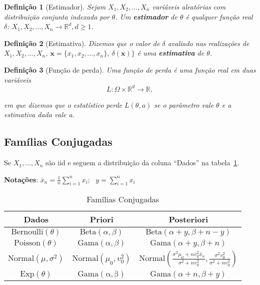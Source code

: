 \documentclass{article}
\newtheorem{definition}{Definição}
\begin{document}
	\begin{definition}[Estimador]
		Sejam $X_1, X_2, \ldots, X_n$ variáveis aleatórias com distribuição conjunta indexada por $\theta$. Um \textbf{estimador} de $\theta$ é qualquer função real $\delta$: $X_1, X_2, \ldots, X_n \rightarrow \mathbb{R}^d, d \geq 1$.
	\end{definition}
	
	\begin{definition}[Estimativa]
		Dizemos que o valor de $\delta$ avaliado nas realizações de $X_1, X_2, \ldots, X_n$, $\textbf{x} = \{x_1, x_2, \ldots, x_n\}, \ \delta(\textbf{x})\}$ é uma \textbf{estimativa} de $\theta$.
	\end{definition}
	
	\begin{definition}[Função de perda]
		Uma função de perda é uma função real em duas variáveis 
		\begin{equation}
			L: \Omega \times \mathbb{R}^d \rightarrow \mathbb{R},
		\end{equation}
		
		em que dizemos que o estatístico \textit{perde} $L(\theta, a)$ se o parâmetro vale $\theta$ e a estimativa dada vale a.
	\end{definition}
	
	\subsection*{Famílias Conjugadas}
	
	Se $X_1,\ldots,X_n$ são iid e seguem a distribuição da coluna ``Dados'' na tabela~\ref{tab:1}.
	
	\textbf{Notações}: $\bar {x}_n= \frac{1}{n}\sum_{i=1}^n x_i;~~~
	y=\sum_{i=1}^nx_i$
	\begin{table}[!htb]
		\centering
		\begin{tabular}{|c|c|c|}
			\hline \textbf{Dados} & \textbf{Priori} & \textbf{Posteriori}\\ \hline
			$\mathrm{Bernoulli}(\theta)$&$\mathrm{Beta}(\alpha,\beta)$ & $\mathrm{Beta}(\alpha+y,\beta+n-y)$ \\ \hline
			$\mathrm{Poisson}(\theta)$&$\mathrm{Gama}(\alpha,\beta)$&$\mathrm{Gama}(\alpha+y,\beta+n)$\\ \hline 
			$\mathrm{Normal}(\mu,\sigma^2)$ & $\mathrm{Normal}(\mu_0,v_0^2)$& $\mathrm{Normal}\left(\frac{\sigma^2\mu_0+nv_0^2\bar{x}_n}{\sigma^2+nv_0^2},\frac{\sigma^2v_0^2}{\sigma^2+nv_0^2}\right)$ \\ \hline
			$\mathrm{Exp}(\theta)$ &$\mathrm{Gama(\alpha,\beta)}$ & $\mathrm{Gama}(\alpha+n,\beta+y)$ \\ \hline
			
		\end{tabular}
		\caption{Famílias Conjugadas}\label{tab:1}
	\end{table}
	
\end{document}
